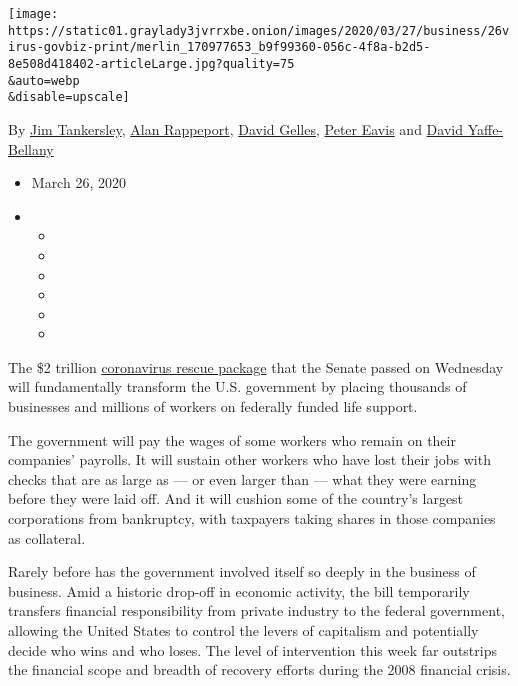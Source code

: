 \texttt{[image: https://static01.graylady3jvrrxbe.onion/images/2020/03/27/business/26virus-govbiz-print/merlin\_170977653\_b9f99360-056c-4f8a-b2d5-8e508d418402-articleLarge.jpg?quality=75\\\&auto=webp\\\&disable=upscale]}

By \href{https://www.nytimes3xbfgragh.onion/by/jim-tankersley}{Jim
Tankersley},
\href{https://www.nytimes3xbfgragh.onion/by/alan-rappeport}{Alan
Rappeport},
\href{https://www.nytimes3xbfgragh.onion/by/david-gelles}{David Gelles},
\href{https://www.nytimes3xbfgragh.onion/by/peter-eavis}{Peter Eavis}
and
\href{http://www.nytimes3xbfgragh.onion/by/david-yaffe-bellany}{David
Yaffe-Bellany}

\begin{itemize}
\item
  March 26, 2020
\item
  \begin{itemize}
  \item
  \item
  \item
  \item
  \item
  \item
  \end{itemize}
\end{itemize}

The \$2 trillion
\href{https://www.nytimes3xbfgragh.onion/2020/07/28/us/politics/coronavirus-relief-bills-house-senate.html}{coronavirus
rescue package} that the Senate passed on Wednesday will fundamentally
transform the U.S. government by placing thousands of businesses and
millions of workers on federally funded life support.

The government will pay the wages of some workers who remain on their
companies' payrolls. It will sustain other workers who have lost their
jobs with checks that are as large as --- or even larger than --- what
they were earning before they were laid off. And it will cushion some of
the country's largest corporations from bankruptcy, with taxpayers
taking shares in those companies as collateral.

Rarely before has the government involved itself so deeply in the
business of business. Amid a historic drop-off in economic activity, the
bill temporarily transfers financial responsibility from private
industry to the federal government, allowing the United States to
control the levers of capitalism and potentially decide who wins and who
loses. The level of intervention this week far outstrips the financial
scope and breadth of recovery efforts during the 2008 financial crisis.

